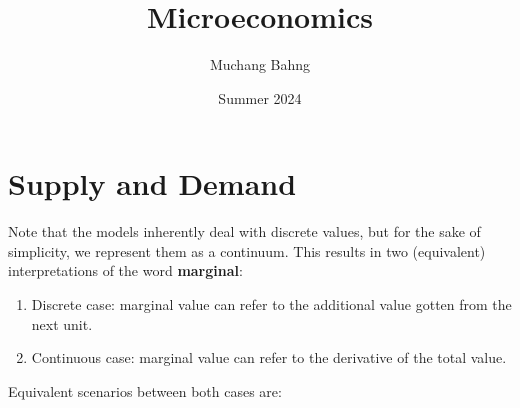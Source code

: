 \documentclass{article}
\begin{document}
\title{Microeconomics}
\author{Muchang Bahng}
\date{Summer 2024}

\maketitle
\tableofcontents
\pagebreak

\section{Supply and Demand}

  Note that the models inherently deal with discrete values, but for the sake of simplicity, we represent them as a continuum. This results in two (equivalent) interpretations of the word \textbf{marginal}: 
  \begin{enumerate}
      \item Discrete case: marginal value can refer to the additional value gotten from the next unit. 
      \item Continuous case: marginal value can refer to the derivative of the total value. 
  \end{enumerate}
  Equivalent scenarios between both cases are: 
\end{document}
